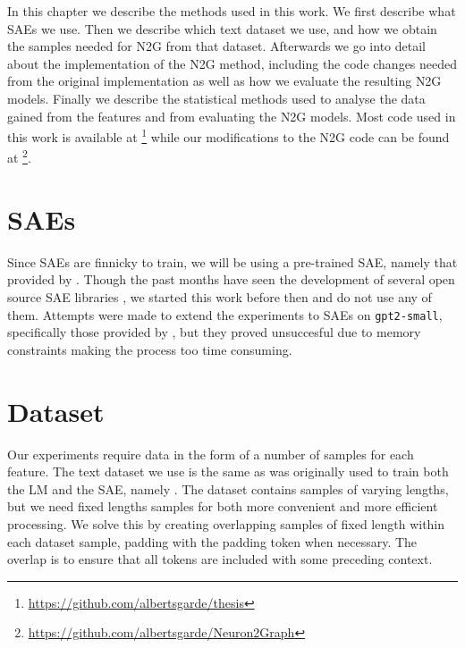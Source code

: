 In this chapter we describe the methods used in this work.
We first describe what \acp{SAE} we use.
Then we describe which text dataset we use, and how we obtain the samples needed for \ac{N2G} from that dataset.
Afterwards we go into detail about the implementation of the \ac{N2G} method, including the code changes needed from the original implementation as well as how we evaluate the resulting \ac{N2G} models.
Finally we describe the statistical methods used to analyse the data gained from the features and from evaluating the \ac{N2G} models.
Most code used in this work is available at \footnote{\url{https://github.com/albertsgarde/thesis}} while our modifications to the \ac{N2G} code can be found at \footnote{\url{https://github.com/albertsgarde/Neuron2Graph}}.

\section{\acp{SAE}}
Since \acp{SAE} are finnicky to train, we will be using a pre-trained SAE, namely that provided by \textcite{nanda_neelnandasparse_autoencoder_nodate}.
Though the past months have seen the development of several open source \ac{SAE} libraries \parencite{bloom_jbloomaussaelens_2024}\parencite{cooney_ai-safety-foundationsparse_autoencoder_2024}, we started this work before then and do not use any of them.
Attempts were made to extend the experiments to \acp{SAE} on \texttt{gpt2-small}, specifically those provided by \textcite{wu_openaisparse_autoencoder_2024}, but they proved unsuccesful due to memory constraints making the process too time consuming.

\section{Dataset}
\label{sec:dataset}
Our experiments require data in the form of a number of samples for each feature.
The text dataset we use is the same as was originally used to train both the \ac{LM} and the SAE, namely \textcite{nanda_neelnandac4-code-20k_nodate}.
The dataset contains samples of varying lengths, but we need fixed lengths samples for both more convenient and more efficient processing.
We solve this by creating overlapping samples of fixed length within each dataset sample, padding with the padding token when necessary.
The overlap is to ensure that all tokens are included with some preceding context.

